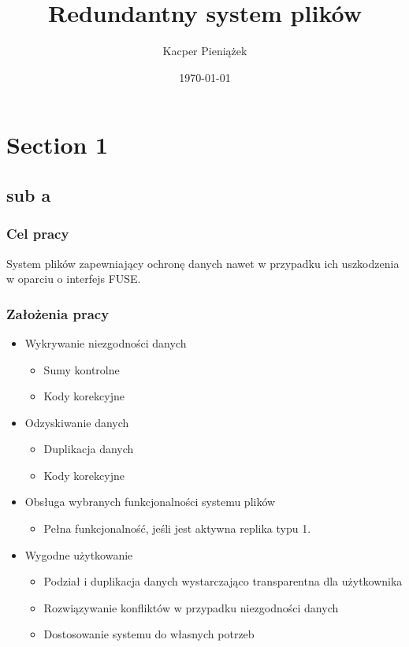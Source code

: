 \documentclass{beamer}
\title{Redundantny system plików}
\author{Kacper Pieniążek}
\date{\today}
\begin{document}
	\begin{frame}
		\titlepage
	\end{frame}

	\section{Section 1}
	\subsection{sub a}
	
	\begin{frame}
		\frametitle{Cel pracy}
			System plików zapewniający ochronę danych nawet w przypadku ich uszkodzenia w oparciu o interfejs FUSE.
	\end{frame}

	\begin{frame}
		\frametitle{Założenia pracy}
		\begin{itemize}
			\pause
			\item Wykrywanie niezgodności danych
				\begin{itemize}
					\item Sumy kontrolne
					\item Kody korekcyjne
				\end{itemize}
			\pause
			\item Odzyskiwanie danych
			\begin{itemize}
				\item Duplikacja danych
				\item Kody korekcyjne
			\end{itemize}
			\pause
			\item Obsługa wybranych funkcjonalności systemu plików
			\begin{itemize}
				\item Pełna funkcjonalność, jeśli jest aktywna replika typu 1.
			\end{itemize}
			\pause
			\item Wygodne użytkowanie
			\begin{itemize}
				\item Podział i duplikacja danych wystarczająco transparentna dla użytkownika
				\item Rozwiązywanie konfliktów w przypadku niezgodności danych
				\item Dostosowanie systemu do własnych potrzeb
			\end{itemize}
		\end{itemize}
	\end{frame}
	
\end{document}

